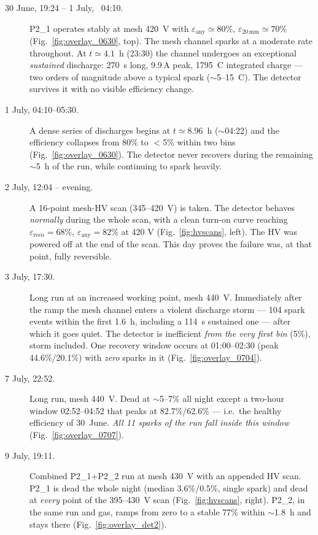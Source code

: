 \documentclass[11pt,a4paper]{article}
\newcommand{\detone}{P2\_1}
\newcommand{\dettwo}{P2\_2}
\newcommand{\uA}{\,\textmu A}
\begin{document}
\begin{description}
  \item[30 June, 19:24 -- 1 July, ~04:10.] \detone{} operates stably at mesh
  420~V with $\varepsilon_{\text{any}}\simeq 80\%$,
  $\varepsilon_{20\,\text{mm}}\simeq 70\%$
  (Fig.~\ref{fig:overlay_0630}, top). The mesh channel sparks at a moderate
  rate throughout. At $t\simeq4.1$~h (23:30) the channel undergoes an
  exceptional \emph{sustained} discharge: 270~s long, 9.9\uA{} peak,
  1795~\textmu C integrated charge --- two orders of magnitude above a
  typical spark ($\sim$5--15~\textmu C). The detector survives it with no
  visible efficiency change.
  \item[1 July, 04:10--05:30.] A dense series of discharges begins at
  $t\simeq8.96$~h ($\sim$04:22) and the efficiency collapses from 80\% to
  $<$5\% within two bins (Fig.~\ref{fig:overlay_0630}). The detector never
  recovers during the remaining $\sim$5~h of the run, while continuing to
  spark heavily.
  \item[2 July, 12:04 -- evening.] A 16-point mesh-HV scan
  (345--420~V) is taken. The detector behaves \emph{normally} during the
  whole scan, with a clean turn-on curve reaching
  $\varepsilon_{\text{reco}}=68\%$, $\varepsilon_{\text{any}}=82\%$ at 420 V
  (Fig.~\ref{fig:hvscans}, left). The HV was powered off at the end of the
  scan. This day proves the failure was, at that point, fully reversible.
  \item[3 July, 17:30.] Long run at an increased working point, mesh 440~V.
  Immediately after the ramp the mesh channel enters a violent discharge
  storm --- 104 spark events within the first 1.6~h, including a 114~s
  sustained one --- after which it goes quiet. The detector is inefficient
  \emph{from the very first bin} (5\%), storm included. One recovery window
  occurs at 01:00--02:30 (peak 44.6\%/20.1\%) with \emph{zero} sparks in it
  (Fig.~\ref{fig:overlay_0704}).
  \item[7 July, 22:52.] Long run, mesh 440~V. Dead at $\sim$5--7\% all
  night except a two-hour window 02:52--04:52 that peaks at 82.7\%/62.6\% ---
  i.e.\ the healthy efficiency of 30~June. \emph{All 11 sparks of the run
  fall inside this window} (Fig.~\ref{fig:overlay_0707}).
  \item[9 July, 19:11.] Combined \detone+\dettwo{} run at mesh 430~V with an
  appended HV scan. \detone{} is dead the whole night (median 3.6\%/0.5\%,
  single spark) and dead at \emph{every} point of the 395--430~V scan
  (Fig.~\ref{fig:hvscans}, right). \dettwo, in the same run and gas, ramps
  from zero to a stable 77\% within $\sim$1.8~h and stays there
  (Fig.~\ref{fig:overlay_det2}).
\end{description}
\end{document}
